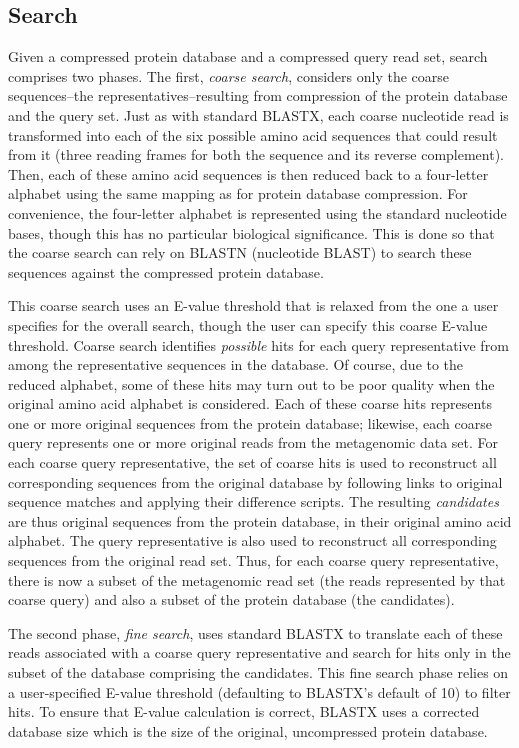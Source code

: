 \documentclass{amsbook}
\theoremstyle{definition}
\theoremstyle{remark}
\numberwithin{equation}{section}
\begin{document}
\subsection*{Search}

Given a compressed protein database and a compressed query read set, search
comprises two phases.
The first, \emph{coarse search}, considers only the coarse sequences--the
representatives--resulting from compression of the protein database and the
query set.
Just as with standard BLASTX, each coarse nucleotide read is transformed into 
each of the six possible amino acid sequences that could result from it (three 
reading frames for both the sequence and its reverse complement).
Then, each of these amino acid sequences is then reduced back to a four-letter
alphabet using the same mapping as for protein database compression.
For convenience, the four-letter alphabet is represented using the standard
nucleotide bases, though this has no particular biological significance.
This is done so that the coarse search can rely on BLASTN (nucleotide BLAST) to
search these sequences against the compressed protein database.

This coarse search uses an E-value threshold that is relaxed from the one a user
specifies for the overall search, though the user can specify this coarse 
E-value threshold.
Coarse search identifies \emph{possible} hits for each query representative from
among the representative sequences in the database.
Of course, due to the reduced alphabet, some of these hits may turn out to be
poor quality when the original amino acid alphabet is considered.
Each of these coarse hits represents one or more original sequences from the
protein database; likewise, each coarse query represents one or more original
reads from the metagenomic data set.
For each coarse query representative, the set of coarse hits is used to
reconstruct all corresponding sequences from the original database by following
links to original sequence matches and applying their difference scripts.
The resulting \emph{candidates} are thus original sequences from the protein
database, in their original amino acid alphabet.
The query representative is also used to reconstruct all corresponding sequences
from the original read set.
Thus, for each coarse query representative, there is now a subset of the
metagenomic read set (the reads represented by that coarse query) and also a
subset of the protein database (the candidates).

The second phase, \emph{fine search}, uses standard BLASTX to translate each
of these reads associated with a coarse query representative and search for
hits only in the subset of the database comprising the candidates.
This fine search phase relies on a user-specified E-value threshold (defaulting
to BLASTX's default of 10) to filter hits.
To ensure that E-value calculation is correct, BLASTX uses a corrected database
size which is the size of the original, uncompressed protein database.
\end{document}
